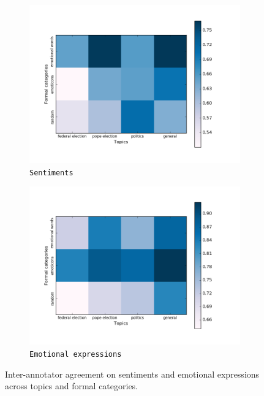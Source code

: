 \begin{figure}[htbp!]
{
\centering
\begin{subfigure}{.5\textwidth}
  \centering
  \includegraphics[width=\linewidth]{img/sentiment_agreement.png}
  \caption{\texttt{Sentiments}}
\end{subfigure}%
\begin{subfigure}{.5\textwidth}
  \centering
  \includegraphics[width=\linewidth]{img/emo-expression_agreement.png}
  \caption{\texttt{Emotional expressions}}
\end{subfigure}
}
\caption{Inter-annotator agreement on sentiments and emotional
  expressions across topics and formal categories.}\label{snt:fig:crp-sent-emo-agr}
\end{figure}

